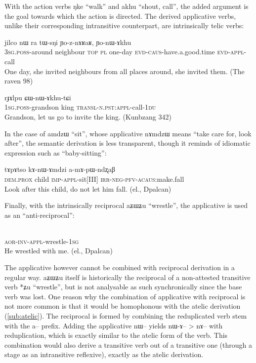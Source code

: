 \documentclass[oldfontcommands,oneside,a4paper,11pt]{memoir}
\newcommand{\ipa}[1]{{\phon #1}} %
\newcommand{\acaus}{\textsc{acaus}}
\newcommand{\appl}{\textsc{appl}}
\newcommand{\aor}{\textsc{aor}}
\newcommand{\caus}{\textsc{caus}}
\newcommand{\dem}{\textsc{dem}}
\newcommand{\du}{\textsc{du}}
\newcommand{\evd}{\textsc{evd}}
\newcommand{\imp}{\textsc{imp}}
\newcommand{\inv}{\textsc{inv}}
\newcommand{\irr}{\textsc{irr}}
\newcommand{\negat}{\textsc{neg}}
\newcommand{\npst}{\textsc{n.pst}}
\newcommand{\pfv}{\textsc{pfv}}
\newcommand{\pl}{\textsc{pl}}
\newcommand{\poss}{\textsc{poss}}
\newcommand{\prox}{\textsc{prox}}
\newcommand{\sg}{\textsc{sg}}
\newcommand{\topic}{\textsc{top}}
\newcommand{\transloc}{\textsc{transl}}
\begin{document}
  
 With the action verbs \ipa{ŋke} ``walk'' and \ipa{akhu} ``shout, call'', the added argument is the goal towards which the action is directed. The derived applicative verbs, unlike their corresponding intransitive counterpart, are intrinsically telic verbs:
 
   \begin{exe}
   \ex 
\gll \ipa{ɯ-rkɤrkɯ} \ipa{jilco} 	\ipa{nɯ} 	\ipa{ra} 	\ipa{tɯ-sŋi} 	\ipa{ɲo-z-nɤʁaʁ,} 	\ipa{ɲo-nɯ-ɤkhu}  \\
 3\sg{}.\poss{}-around neighbour \topic{} \pl{} one-day \evd{}-\caus{}-have.a.good.time \evd{}-\appl{}-call \\
 \glt    One day, she invited  neighbours from all places around, she invited them. (The raven 98)
   \end{exe} 
  
   \begin{exe}
   \ex 
\gll \ipa{a-ɣe} 	\ipa{rɟɤlpu} 	\ipa{ɕɯ-nɯ-ɤkhu-tɕi} \\
  1\sg{}.\poss{}-grandson king \transloc{}-\npst{}:\appl{}-call-1\du{} \\
 \glt    Grandson, let us go to invite the king. (Kunbzang 342)
   \end{exe} 
  
  In the case of  \ipa{amdzɯ} ``sit'', whose applicative \ipa{nɤmdzɯ} means ``take care for, look after'', the semantic derivation is less transparent, though it reminds of idiomatic expression such as ``baby-sitting'':
   \begin{exe}
   \ex 
\gll \ipa{ki} 	\ipa{tɤpɤtso} 	\ipa{kɤ-nɯ-ɤmdzi} 	\ipa{a-mɤ-pɯ-ndʐaβ}  \\
\dem{}.\prox{} child \imp{}-\appl{}-sit[III] \irr{}-\negat-\pfv{}-\acaus{}:make.fall \\
 \glt    Look after this child, do not let him fall. (el., Dpalcan)
   \end{exe} 


Finally, with the intrinsically reciprocal \ipa{aʑɯʑu} ``wrestle'', the applicative is used as an ``anti-reciprocal'':

   \begin{exe}
   \ex 
\gll \ipa{tɤ́-wɣ-nɯ-ɤʑɯʑu-a} 	   \\
\aor{}-\inv{}-\appl{}-wrestle-1\sg{}  \\
 \glt    He wrestled with me. (el., Dpalcan)
   \end{exe} 
The applicative however cannot be combined with reciprocal derivation in a regular way. \ipa{aʑɯʑu} itself is historically the reciprocal of a non-attested transitive verb *ʑu ``wrestle'', but is not analysable as such synchronically since the base verb was lost. One reason why the combination of applicative with reciprocal is not more common is that   it would be homophonous with the atelic derivation (\ref{sub:atelic}). The reciprocal is formed by combining the reduplicated verb stem with the \ipa{a}-- prefix. Adding the applicative \ipa{nɯ}-- yields \ipa{nɯ-ɤ}-- > \ipa{nɤ}-- with reduplication, which is exactly similar to the atelic form of the verb. This combination would also derive a transitive verb out of a transitive one (through a stage as an intransitive reflexive), exactly as the atelic derivation.
\end{document}
